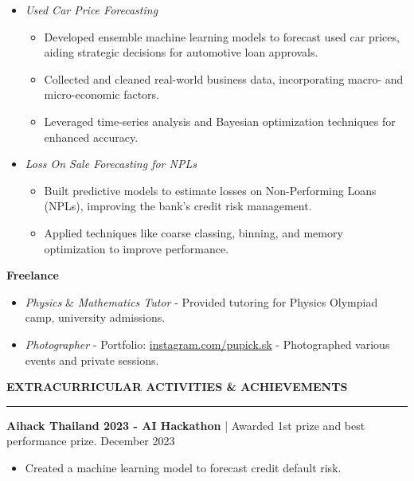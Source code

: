\documentclass[a4paper, 11pt]{article}
\begin{document}
\begin{itemize}[topsep=0pt, parsep=0pt]
    \item \textit{Used Car Price Forecasting}
    {\fontsize{11pt}{11pt}\selectfont
    \begin{itemize}[noitemsep, topsep=0pt, partopsep=0pt, parsep=0pt, leftmargin=*]
        \item Developed ensemble machine learning models to forecast used car prices, aiding strategic decisions for automotive loan approvals.
        \item Collected and cleaned real-world business data, incorporating macro- and micro-economic factors.
        \item Leveraged time-series analysis and Bayesian optimization techniques for enhanced accuracy.
    \end{itemize}
    }
    \item \textit{Loss On Sale Forecasting for NPLs}
    {\fontsize{11pt}{11pt}\selectfont
    \begin{itemize}[noitemsep, topsep=0pt, partopsep=0pt, parsep=0pt, leftmargin=*]
        \item Built predictive models to estimate losses on Non-Performing Loans (NPLs), improving the bank's credit risk management.
        \item Applied techniques like coarse classing, binning, and memory optimization to improve performance.
    \end{itemize}
    }
\end{itemize}

\textbf{Freelance}
\begin{itemize}[noitemsep, topsep=0pt, partopsep=0pt, parsep=0pt]
    \item \textit{Physics} \& \textit{Mathematics Tutor} - Provided tutoring for Physics Olympiad camp, university admissions.
    \item \textit{Photographer} - Portfolio: \href{https://www.instagram.com/pupick.sk/}{instagram.com/pupick.sk} - Photographed various events and private sessions.
\end{itemize}

\vspace{6pt}
\textbf{EXTRACURRICULAR ACTIVITIES \& ACHIEVEMENTS}
\vspace{5pt}
{\hrule}
\vspace{6pt}

\textbf{Aihack Thailand 2023 - AI Hackathon} | Awarded 1st prize and best performance prize. \hfill December 2023
\begin{itemize}[noitemsep, topsep=0pt, partopsep=0pt, parsep=0pt]
    \item Created a machine learning model to forecast credit default risk.
\end{itemize}
\vspace{3pt}
\end{document}
